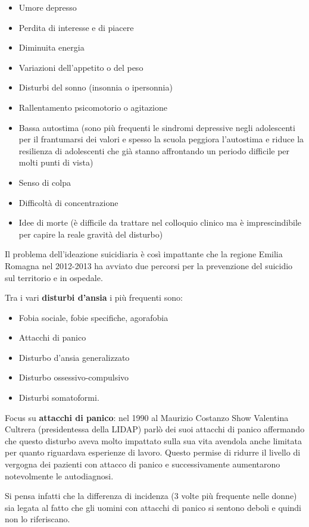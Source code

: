\documentclass[]{article}
\begin{document}
\begin{itemize}
\item
  Umore depresso
\item
  Perdita di interesse e di piacere
\item
  Diminuita energia
\item
  Variazioni dell'appetito o del peso
\item
  Disturbi del sonno (insonnia o ipersonnia)
\item
  Rallentamento psicomotorio o agitazione
\item
  Bassa autostima (sono più frequenti le sindromi depressive negli
  adolescenti per il frantumarsi dei valori e spesso la scuola peggiora
  l'autostima e riduce la resilienza di adolescenti che già stanno
  affrontando un periodo difficile per molti punti di vista)
\item
  Senso di colpa
\item
  Difficoltà di concentrazione
\item
  Idee di morte (è difficile da trattare nel colloquio clinico ma è
  imprescindibile per capire la reale gravità del disturbo)
\end{itemize}

Il problema dell'ideazione suicidiaria è così impattante che la regione
Emilia Romagna nel 2012-2013 ha avviato due percorsi per la prevenzione
del suicidio sul territorio e in ospedale.

Tra i vari \textbf{disturbi d'ansia} i più frequenti sono:

\begin{itemize}
\item
  Fobia sociale, fobie specifiche, agorafobia
\item
  Attacchi di panico
\item
  Disturbo d'ansia generalizzato
\item
  Disturbo ossessivo-compulsivo
\item
  Disturbi somatoformi.
\end{itemize}

Focus su \textbf{attacchi di panico}: nel 1990 al Maurizio Costanzo Show
Valentina Cultrera (presidentessa della LIDAP) parlò dei suoi attacchi
di panico affermando che questo disturbo aveva molto impattato sulla sua
vita avendola anche limitata per quanto riguardava esperienze di lavoro.
Questo permise di ridurre il livello di vergogna dei pazienti con
attacco di panico e successivamente aumentarono notevolmente le
autodiagnosi.

Si pensa infatti che la differenza di incidenza (3 volte più frequente
nelle donne) sia legata al fatto che gli uomini con attacchi di panico
si sentono deboli e quindi non lo riferiscano.
\end{document}
